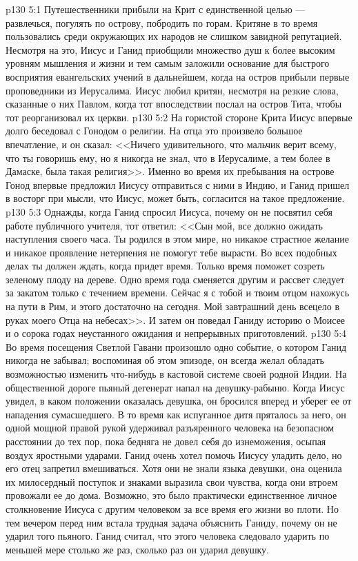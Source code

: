 \vs p130 5:1 Путешественники прибыли на Крит с единственной целью --- развлечься, погулять по острову, побродить по горам. Критяне в то время пользовались среди окружающих их народов не слишком завидной репутацией. Несмотря на это, Иисус и Ганид приобщили множество душ к более высоким уровням мышления и жизни и тем самым заложили основание для быстрого восприятия евангельских учений в дальнейшем, когда на остров прибыли первые проповедники из Иерусалима. Иисус любил критян, несмотря на резкие слова, сказанные о них Павлом, когда тот впоследствии послал на остров Тита, чтобы тот реорганизовал их церкви.
\vs p130 5:2 На гористой стороне Крита Иисус впервые долго беседовал с Гонодом о религии. На отца это произвело большое впечатление, и он сказал: <<Ничего удивительного, что мальчик верит всему, что ты говоришь ему, но я никогда не знал, что в Иерусалиме, а тем более в Дамаске, была такая религия>>. Именно во время их пребывания на острове Гонод впервые предложил Иисусу отправиться с ними в Индию, и Ганид пришел в восторг при мысли, что Иисус, может быть, согласится на такое предложение.
\vs p130 5:3 Однажды, когда Ганид спросил Иисуса, почему он не посвятил себя работе публичного учителя, тот ответил: <<Сын мой, все должно ожидать наступления своего часа. Ты родился в этом мире, но никакое страстное желание и никакое проявление нетерпения не помогут тебе вырасти. Во всех подобных делах ты должен ждать, когда придет время. Только время поможет созреть зеленому плоду на дереве. Одно время года сменяется другим и рассвет следует за закатом только с течением времени. Сейчас я с тобой и твоим отцом нахожусь на пути в Рим, и этого достаточно на сегодня. Мой завтрашний день всецело в руках моего Отца на небесах>>. И затем он поведал Ганиду историю о Моисее и о сорока годах неустанного ожидания и непрерывных приготовлений.
\vs p130 5:4 Во время посещения Светлой Гавани произошло одно событие, о котором Ганид никогда не забывал; воспоминая об этом эпизоде, он всегда желал обладать возможностью изменить что\hyp{}нибудь в кастовой системе своей родной Индии. На общественной дороге пьяный дегенерат напал на девушку\hyp{}рабыню. Когда Иисус увидел, в каком положении оказалась девушка, он бросился вперед и уберег ее от нападения сумасшедшего. В то время как испуганное дитя пряталось за него, он одной мощной правой рукой удерживал разъяренного человека на безопасном расстоянии до тех пор, пока бедняга не довел себя до изнеможения, осыпая воздух яростными ударами. Ганид очень хотел помочь Иисусу уладить дело, но его отец запретил вмешиваться. Хотя они не знали языка девушки, она оценила их милосердный поступок и знаками выразила свои чувства, когда они втроем провожали ее до дома. Возможно, это было практически единственное личное столкновение Иисуса с другим человеком за все время его жизни во плоти. Но тем вечером перед ним встала трудная задача объяснить Ганиду, почему он не ударил того пьяного. Ганид считал, что этого человека следовало ударить по меньшей мере столько же раз, сколько раз он ударил девушку.
